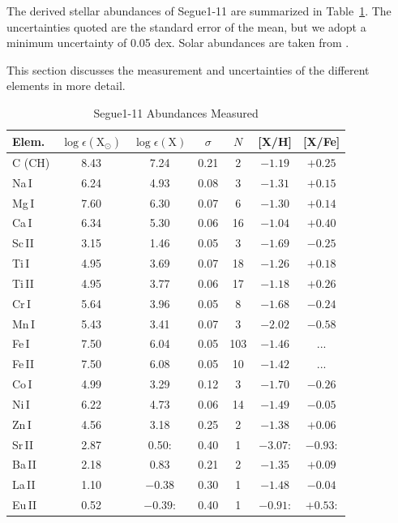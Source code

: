 \documentclass[manuscript]{aastex}
\begin{document}
The derived stellar abundances of Segue1-11 are summarized in Table~\ref{tab:seg11_abund}. The uncertainties quoted are the standard error of the mean, but we adopt a minimum uncertainty of 0.05 dex. Solar abundances are taken from \citet{Asplund2009}.

 This section discusses the measurement and uncertainties of the different elements in more detail.


\begin{table}
  \begin{center}
 \caption{Segue1-11 Abundances Measured}
 \label{tab:seg11_abund}
    \begin{tabular}{l c c c c c c}
     \hline \hline
Elem. & $\log\epsilon (\mbox{X}_{\odot})$ & $\log\epsilon (\mbox{X})$ & $\sigma$ & $N$ & [X/H] & [X/Fe] \\ \hline
C (CH) & 8.43 & 7.24     & 0.21 & 2   & $-1.19$ & $+0.25 $ \\
Na\,I  & 6.24 & 4.93     & 0.08 & 3   & $-1.31$ & $+0.15 $ \\
Mg\,I  & 7.60 & 6.30     & 0.07 & 6   & $-1.30$ & $+0.14 $ \\
Ca\,I  & 6.34 & 5.30     & 0.06 & 16  & $-1.04$ & $+0.40 $ \\
Sc\,II & 3.15 & 1.46     & 0.05 & 3	  & $-1.69$ & $-0.25 $ \\ 
Ti\,I  & 4.95 & 3.69     & 0.07 & 18  & $-1.26$ & $+0.18 $ \\
Ti\,II & 4.95 & 3.77     & 0.06 & 17  & $-1.18$ & $+0.26 $ \\
Cr\,I  & 5.64 & 3.96     & 0.05 & 8   & $-1.68$ & $-0.24 $ \\
Mn\,I  & 5.43 & 3.41     & 0.07 & 3	  & $-2.02$ & $-0.58 $ \\ 
Fe\,I  & 7.50 & 6.04     & 0.05 & 103 & $-1.46$ & ...      \\
Fe\,II & 7.50 & 6.08     & 0.05 & 10  & $-1.42$ & ...      \\
Co\,I  & 4.99 & 3.29     & 0.12 & 3   & $-1.70$ & $-0.26 $ \\ 
Ni\,I  & 6.22 & 4.73     & 0.06 & 14  & $-1.49$ & $-0.05 $ \\
Zn\,I  & 4.56 & 3.18     & 0.25 & 2   & $-1.38$ & $+0.06 $ \\ 
Sr\,II & 2.87 & 0.50:    & 0.40 & 1  & $-3.07$: & $-0.93$: \\ 
Ba\,II & 2.18 & 0.83     & 0.21 & 2	  & $-1.35$ & $+0.09 $ \\
La\,II & 1.10 & $-0.38$  & 0.30 & 1 & $-1.48$ & $-0.04$ \\
Eu\,II & 0.52 & $-0.39$: & 0.40 & 1	  & $-0.91$: & $+0.53 $: \\ \hline

 \end{tabular}				      
 \end{center}
\end{table}
\end{document}
